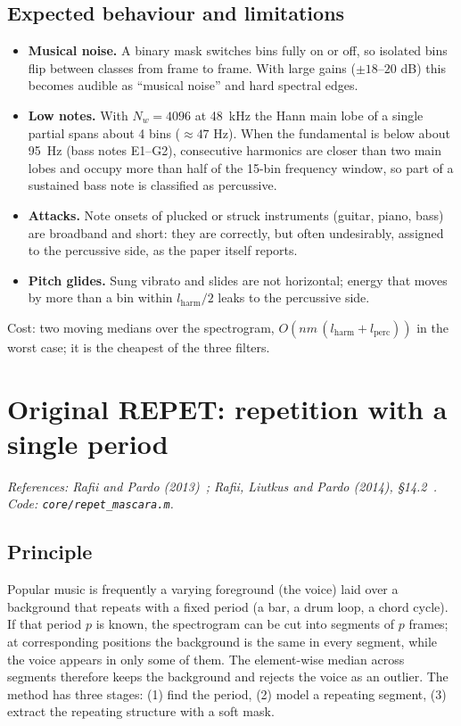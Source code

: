 \documentclass[11pt,a4paper]{article}
\newcommand{\code}[1]{\texttt{#1}}
\begin{document}
\subsection{Expected behaviour and limitations}
\begin{itemize}
  \item \textbf{Musical noise.} A binary mask switches bins fully on or off,
        so isolated bins flip between classes from frame to frame. With large
        gains ($\pm18$--$20$ dB) this becomes audible as ``musical noise''
        and hard spectral edges.
  \item \textbf{Low notes.} With $N_w=4096$ at 48~kHz the Hann main lobe of
        a single partial spans about 4 bins ($\approx47$ Hz). When the
        fundamental is below about 95~Hz (bass notes E1--G2), consecutive
        harmonics are closer than two main lobes and occupy more than half
        of the 15-bin frequency window, so part of a sustained bass note is
        classified as percussive.
  \item \textbf{Attacks.} Note onsets of plucked or struck instruments
        (guitar, piano, bass) are broadband and short: they are correctly,
        but often undesirably, assigned to the percussive side, as the paper
        itself reports.
  \item \textbf{Pitch glides.} Sung vibrato and slides are not horizontal;
        energy that moves by more than a bin within $l_{\text{harm}}/2$
        leaks to the percussive side.
\end{itemize}
Cost: two moving medians over the spectrogram, $O(nm\,(l_{\text{harm}}+l_{\text{perc}}))$
in the worst case; it is the cheapest of the three filters.

\section{Original REPET: repetition with a single period}
\label{sec:repet}
\noindent\textit{References: Rafii and Pardo (2013)~\cite{rafii2013};
Rafii, Liutkus and Pardo (2014), \S14.2~\cite{rafii2014}.
Code: \code{core/repet\_mascara.m}.}

\subsection{Principle}
Popular music is frequently a varying foreground (the voice) laid over a
background that repeats with a fixed period (a bar, a drum loop, a chord
cycle). If that period $p$ is known, the spectrogram can be cut into
segments of $p$ frames; at corresponding positions the background is the
same in every segment, while the voice appears in only some of them. The
element-wise median across segments therefore keeps the background and
rejects the voice as an outlier. The method has three stages: (1) find the
period, (2) model a repeating segment, (3) extract the repeating structure
with a soft mask.
\end{document}
